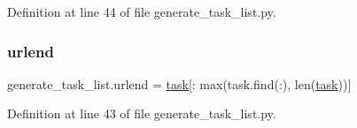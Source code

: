 Definition at line 44 of file generate\+\_\+task\+\_\+list.\+py.

\mbox{\label{namespacegenerate__task__list_a32a1426d61e9e5475d58bdb9db0d22ab}} 
\subsubsection{\texorpdfstring{urlend}{urlend}}
{\footnotesize\ttfamily generate\+\_\+task\+\_\+list.\+urlend = \hyperlink{namespacegenerate__task__list_a6a85e730374a68f9195f2e0e4fc09a9a}{task}\mbox{[}\+: max(task.\+find(\textquotesingle{}\+:\textquotesingle{}), len(\hyperlink{namespacegenerate__task__list_a6a85e730374a68f9195f2e0e4fc09a9a}{task}))\mbox{]}}



Definition at line 43 of file generate\+\_\+task\+\_\+list.\+py.


